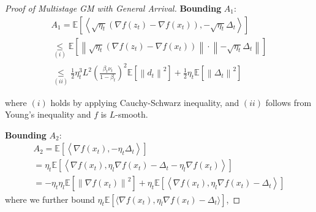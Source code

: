 \begin{proof}[Proof of Multistage GM with General Arrival]
\textbf{Bounding} $A_1$:
\begin{equation}
\begin{gathered}
A_1 =\mathbb{E}\left[\left\langle \sqrt{\eta_t} \left(\nabla f(z_t)-\nabla f(x_t)\right),-\sqrt{\eta_t} \Delta_t \right\rangle\right]\\
\underset{(i)}{\leq}\mathbb{E}\left[\left\|\sqrt{\eta_t} \left(\nabla f(z_t)-\nabla f(x_t)\right)\right\| \cdot \left\|-\sqrt{\eta_t} \Delta_t\right\|\right]\\
\underset{(ii)}{\leq}\frac{1}{2}\eta_t^3 L^2\left(\frac{\beta_t\nu_t}{1-\beta_t}\right)^2\mathbb{E}\left[\left\| d_t\right\|^2\right] + \frac{1}{2}\eta_t\mathbb{E}\left[\left\|\Delta_t\right\|^2\right]
\end{gathered}\nonumber
\end{equation}

where $(i)$ holds by applying Cauchy-Schwarz inequality, and $(ii)$ follows from Young’s inequality and $f$ is $L$-smooth.

 

\textbf{Bounding} $A_2$:
\begin{equation}
\begin{gathered}
A_2=\mathbb{E}\left[\left\langle \nabla f(x_t),-\eta_t \Delta_t \right\rangle\right]\\
=\eta_t\mathbb{E}\left[\left\langle \nabla f\left(x_t\right),\eta_l  \nabla f\left(x_t\right) - \Delta_t - \eta_l  \nabla f\left(x_t\right)  \right\rangle\right]\\
=-\eta_t \eta_l   \mathbb{E}\left [\left\| \nabla f\left(x_t\right) \right\|^2\right]+\eta_t\mathbb{E}\left[\left\langle \nabla f\left(x_t\right), \eta_l   \nabla f\left(x_t\right) - \Delta_t \right\rangle\right]
\end{gathered}\nonumber
\end{equation}
where we further bound $\eta_t\mathbb{E}\left[\langle \nabla f\left(x_t\right), \eta_l   \nabla f\left(x_t\right) - \Delta_t \rangle\right]$,
 

\end{proof}
